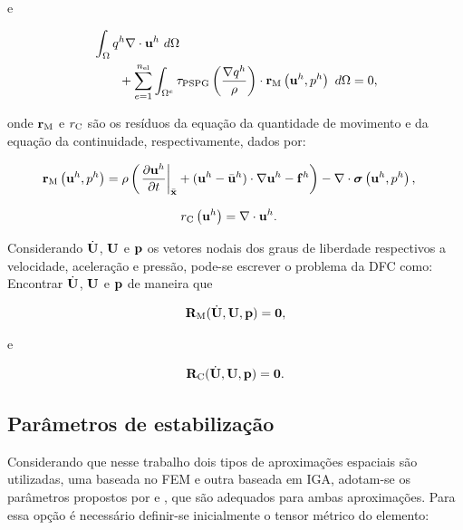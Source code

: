 \documentclass[tese_patricia]{subfiles}%
\begin{document}
\noindent e

\begin{align}
	\begin{split}
	&\int_{\Omega}q^h \nabla \cdot \mathbf{u}^h \ d\Omega \\ 
	&\qquad+ \sum_{e=1}^{n_{\mathrm{el}}} \int_{\Omega^e} \tau_{\mathrm{PSPG}} \left(\frac{\nabla q^h}{\rho}\right) \cdot \mathbf{r}_{\mathrm{M}}\left(\mathbf{u}^h,p^h\right) \  d\Omega = 0,
	\label{eq:RC}
	\end{split}
	\end{align}

\noindent onde $\mathbf{r}_{\mathrm{M}}$ e ${r}_{\mathrm{C}}$ são os resíduos da equação da quantidade de movimento e da equação da continuidade, respectivamente, dados por:

\begin{align}
\mathbf{r}_{\mathrm{M}}\left(\mathbf{u}^h,p^h\right)&=\rho\left(\left.\frac{\partial\mathbf{u}^h}{\partial t}\right|_{\bar{\mathbf{x}}}+(\mathbf{u}^h-\bar{\mathbf{u}}^h)\cdot \nabla\mathbf{u}^h - \mathbf{f}^h\right) - \nabla \cdot \boldsymbol{\sigma}\left(\mathbf{u}^h,p^h\right),
\end{align}

\noindent

\begin{align}
{r}_{\mathrm{C}}\left(\mathbf{u}^h\right)&=\nabla \cdot \mathbf{u}^h.
\end{align}

Considerando $\dot{\mathbf{U}}$, $\mathbf{U}$ e $\mathbf{p}$ os vetores nodais dos graus de liberdade respectivos a velocidade, aceleração e pressão, pode-se escrever o problema da DFC como: Encontrar $\dot{\mathbf{U}}$, $\mathbf{U}$ e $\mathbf{p}$ de maneira que

\begin{align}
\mathbf{R}_\mathrm{M}(\dot{\mathbf{U}},\mathbf{U},\mathbf{p}) = \mathbf{0},\label{eq:momentum_residual}
\end{align}

\noindent e

\begin{align}
\mathbf{R}_\mathrm{C}(\dot{\mathbf{U}},\mathbf{U},\mathbf{p}) = \mathbf{0}. \label{eq:continuity_residual}
\end{align}


\subsection{Parâmetros de estabilização}\label{subsec:taus}

Considerando que nesse trabalho dois tipos de aproximações espaciais são utilizadas, uma baseada no FEM e outra baseada em IGA, adotam-se os parâmetros propostos por  e , que são adequados para ambas aproximações. Para essa opção é necessário definir-se inicialmente o tensor métrico do elemento:
\end{document}
